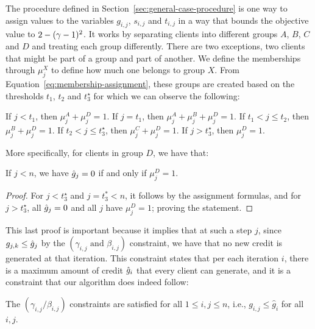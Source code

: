 The procedure defined in Section~\ref{sec:general-case-procedure} is one way to assign values to the variables $g_{i,j}$, $s_{i,j}$ and $t_{i,j}$ in a way that bounds the objective value to $2-(\gamma-1)^2$. It works by separating clients into different groups $A$, $B$, $C$ and $D$ and treating each group differently. There are two exceptions, two clients that might be part of a group and part of another. We define the memberships through $\mu_j^X$ to define how much one belongs to group $X$. 
From Equation~\ref{eq:membership-assignment}, these groups are created based on the thresholds $t_1$, $t_2$ and $t_3^\star$ for which we can observe the following:
\begin{observation}\label{obs:mu-sum}
If $j < t_1$, then $\mu_j^A + \mu_j^D = 1$.
If $j = t_1$, then $\mu_j^A + \mu_j^B + \mu_j^D = 1$.
If $t_1 < j \leq t_2$, then $\mu_j^B + \mu_j^D = 1$.
If $t_2 < j \leq t_3^\star$, then $\mu_j^C + \mu_j^D = 1$.
If $j > t_3^\star$, then $\mu_j^D = 1$.
\end{observation}
More specifically, for clients in group $D$, we have that:
\begin{observation}
If $j<n$, we have $\hat{g}_j = 0$ if and only if $\mu_j^D = 1$.
\end{observation}
\begin{proof}
For $j<t_3^\star$ and $j=t_3^*<n$, it follows by the assignment formulas, and for $j>t_3^\star$, all $\hat{g}_j=0$ and all $j$ have $\mu_j^D=1$; proving the statement.
\end{proof}
This last proof is important because it implies that at such a step $j$, since $g_{j,k}\leq \hat{g}_j$ by the $(\gamma_{i,j}\text{ and }\beta_{i,j})$ constraint, we have that no new credit is generated at that iteration. This constraint states that per each iteration $i$, there is a maximum amount of credit $\hat{g}_i$ that every client can generate, and it is a constraint that our algorithm does indeed follow:
\begin{lemma}\label{lem:gamma-beta-constraints}
    The $(\gamma_{i,j} / \beta_{i,j})$ constraints are satisfied for all $1 \leq i,j \leq n$, i.e., $g_{i,j} \leq \hat{g}_i$ for all $i,j$.
\end{lemma}
